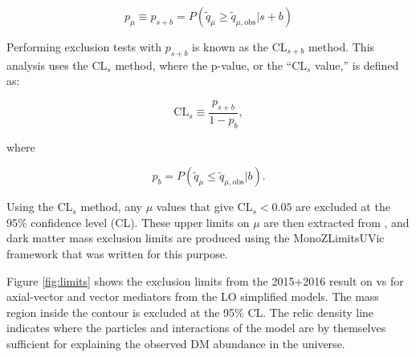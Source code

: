 \begin{equation}
p_\mu \equiv p_{s+b} = P(\tilde q_\mu \geq \tilde{q}_{\mu,\text{obs}} | s+b)
\end{equation}

\noindent Performing exclusion tests with $p_{s+b}$ is known as the CL$_{s+b}$ method. This analysis uses the CL$_s$ method, where the p-value, or the ``CL$_s$ value,'' is defined as:

\begin{equation}
\text{CL}_s \equiv \frac{p_{s+b}}{1-p_b},
\end{equation}

\noindent where 

\begin{equation}
p_b = P(\tilde q_\mu \leq \tilde{q}_{\mu,\text{obs}} | b).
\end{equation}

Using the CL$_s$ method, any $\mu$ values that give CL$_s<0.05$ are excluded at the 95\% confidence level (CL). These upper limits on $\mu$ are then extracted from \histfitter, and dark matter mass exclusion limits are produced using the MonoZLimitsUVic framework that was written for this purpose.

Figure \ref{fig:limits} shows the exclusion limits from the 2015+2016 result on \mchi vs \mmed for axial-vector and vector mediators from the LO simplified models. The mass region inside the contour is excluded at the 95\% CL. The relic density line indicates where the particles and interactions of the model are by themselves sufficient for explaining the observed DM abundance in the universe.

